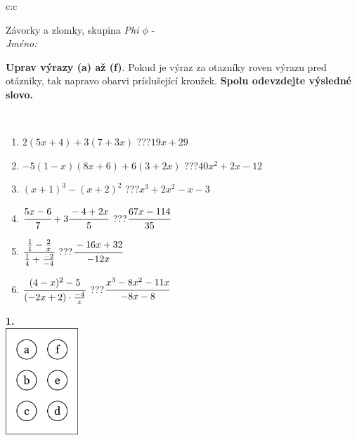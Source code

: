 \documentclass[10pt]{report}
\begin{document}
\begin{tabular}{c:c}
\begin{minipage}[c][104.5mm][t]{0.5\linewidth}
\begin{center}
\vspace{7mm}
{\huge Závorky a zlomky, skupina \textit{Phi $\phi$} -}\\[5mm]
\textit{Jméno:}\phantom{xxxxxxxxxxxxxxxxxxxxxxxxxxxxxxxxxxxxxxxxxxxxxxxxxxxxxxxxxxxxxxxxx}\\[5mm]
\begin{minipage}{0.95\linewidth}
\begin{center}
\textbf{Uprav výrazy (a) až (f)}. Pokud je výraz za otazníky roven výrazu pred otázniky, tak napravo obarvi príslušející kroužek. \textbf{Spolu odevzdejte výsledné slovo.}
\end{center}
\end{minipage}
\\[1mm]
\begin{minipage}{0.79\linewidth}
\begin{center}
\begin{varwidth}{\linewidth}
\begin{enumerate}
\normalsize
\item $2(5x+4)+3(7+3x)$\quad \dotfill\; ???\;\dotfill \quad $19x+29$
\item $-5(1-x)(8x+6)+6(3+2x)$\quad \dotfill\; ???\;\dotfill \quad $40x^2+2x-12$
\item $(x+1)^3-(x+2)^2$\quad \dotfill\; ???\;\dotfill \quad $x^3+2x^2-x-3$
\item $\cfrac{5x-6}{7}+3\cfrac{-4+2x}{5}$\quad \dotfill\; ???\;\dotfill \quad $\cfrac{67x-114}{35}$
\item $\cfrac{\frac{1}{1}-\frac{2}{x}}{\frac{1}{4}+\frac{-2}{-4}}$\quad \dotfill\; ???\;\dotfill \quad $\cfrac{-16x+32}{-12x}$
\item $\cfrac{(4-x)^2-5}{(-2x+2)\cdot\frac{-4}{x}}$\quad \dotfill\; ???\;\dotfill \quad $\cfrac{x^3-8x^2-11x}{-8x-8}$
\end{enumerate}
\end{varwidth}
\end{center}
\end{minipage}
\begin{minipage}{0.20\linewidth}
\begin{center}
{\Huge\bfseries 1.} \\[2mm]
\includegraphics[height=40mm]{../images/braille.png}

\end{center}
\end{minipage}
\end{center}
\end{minipage}
\end{tabular}
\end{document}
